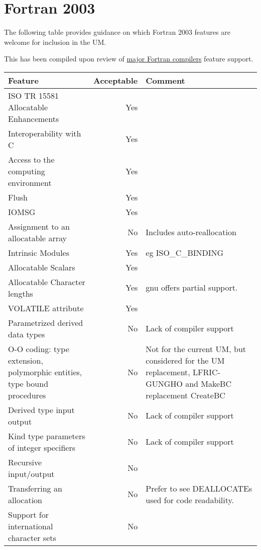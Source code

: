 \section{Fortran 2003}
\label{app:F2003}

The following table provides guidance on which Fortran 2003 features are welcome for inclusion in the UM.

This has been compiled upon review of \href{http://fortranwiki.org/fortran/show/Fortran+2003+status}{major Fortran
compilers} feature support.

\vspace{1cm}
\begin{tabular}{|p{3in}|r|p{2in}|} \hline
\bf{Feature} & \bf{Acceptable} & \bf{Comment} \\ \hline
ISO TR 15581 Allocatable Enhancements & Yes & \\ \hline
Interoperability with C & Yes & \\ \hline
Access to the computing environment & Yes & \\  \hline
Flush & Yes & \\  \hline
IOMSG & Yes & \\  \hline
Assignment to an allocatable array & No & Includes auto-reallocation \\  \hline
Intrinsic Modules & Yes &  eg ISO\_C\_BINDING\\  \hline
Allocatable Scalars  & Yes &  \\  \hline
Allocatable Character lengths  & Yes &  gnu offers partial support. \\  \hline
VOLATILE attribute & Yes & \\  \hline
Parametrized derived data types  & No & Lack of compiler support \\  \hline
O-O coding: 
type extension, polymorphic entities, type bound procedures  & No &  Not for the current UM, but considered for the UM replacement, LFRIC-GUNGHO and MakeBC replacement CreateBC \\ \hline
Derived type input output & No & Lack of compiler support \\  \hline
Kind type parameters of integer specifiers  & No & Lack of compiler support \\  \hline
Recursive input/output & No & \\  \hline 
Transferring an allocation  & No & Prefer to see DEALLOCATEs used for code readability.\\  \hline 
Support for international character sets & No & \\  \hline 
\end{tabular}
